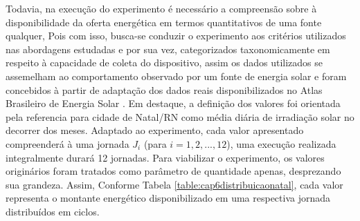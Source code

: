 Todavia, na execução do experimento é necessário a compreensão sobre à disponibilidade da oferta energética em termos quantitativos de uma fonte qualquer, Pois com isso, busca-se conduzir o experimento aos critérios utilizados nas abordagens estudadas e por sua vez, categorizados taxonomicamente em respeito à capacidade de coleta do dispositivo, assim os dados utilizados se assemelham ao comportamento observado por um fonte de energia solar e foram concebidos à partir de adaptação dos dados reais disponibilizados no Atlas Brasileiro de Energia Solar \cite{martins2017atlas}. Em destaque, a definição dos valores foi orientada pela referencia para cidade de Natal/RN como média diária de irradiação solar no decorrer dos meses. Adaptado ao experimento, cada valor apresentado compreenderá à uma jornada $J_i$ (para $i = 1,2,...,12$), uma execução realizada integralmente durará 12 jornadas. Para viabilizar o experimento, os valores originários foram tratados como parâmetro de quantidade apenas, desprezando sua grandeza. Assim,  Conforme Tabela \ref{table:cap6distribuicaonatal}, cada valor representa o montante energético disponibilizado em uma respectiva jornada distribuídos em ciclos.

\begingroup

\setlength{\tabcolsep}{10pt} %
\renewcommand{\arraystretch}{1.5} %

